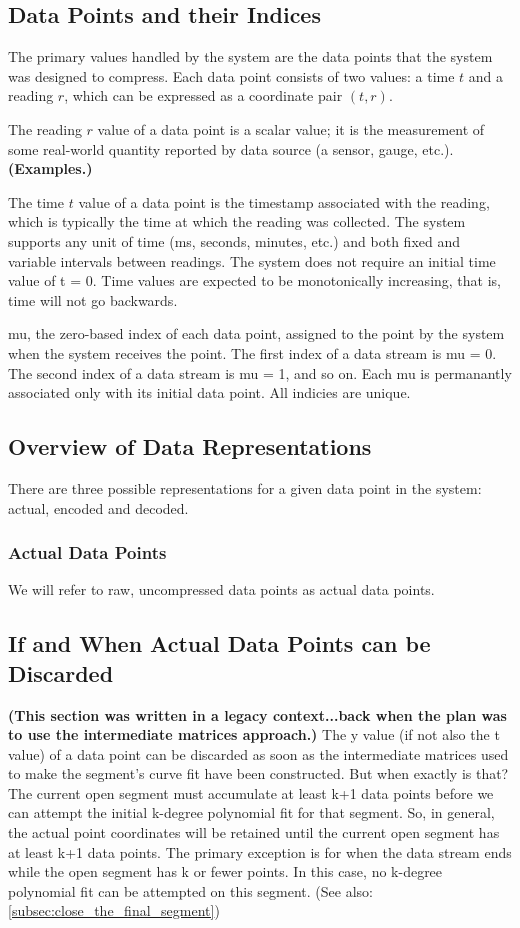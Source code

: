 \documentclass{article}
\begin{document}
\subsection{Data Points and their Indices}
The primary values handled by the system are the data points that the system was designed to compress. Each data point consists of two values: a time \(t\) and a reading \(r\), which can be expressed as a coordinate pair \((t, r)\).

The reading \(r\) value of a data point is a scalar value; it is the measurement of some real-world quantity reported by data source (a sensor, gauge, etc.). \textbf{(Examples.)}

The time \(t\) value of a data point is the timestamp associated with the reading, which is typically the time at which the reading was collected. The system supports any unit of time (ms, seconds, minutes, etc.) and both fixed and variable intervals between readings. The system does not require an initial time value of t = 0. Time values are expected to be monotonically increasing, that is, time will not go backwards.

mu, the zero-based index of each data point, assigned to the point by the system when the system receives the point. The first index of a data stream is mu = 0. The second index of a data stream is mu = 1, and so on. Each mu is permanantly associated only with its initial data point. All indicies are unique.

\subsection{Overview of Data Representations}
There are three possible representations for a given data point in the system: actual, encoded and decoded.
\subsubsection{Actual Data Points}
We will refer to raw, uncompressed data points as actual data points. 

\subsection{If and When Actual Data Points can be Discarded}
\label{subsec:when_can_discard_point_coords}
\textbf{(This section was written in a legacy context...back when the plan was to use the intermediate matrices approach.)}
The y value (if not also the t value) of a data point can be discarded as soon as the intermediate matrices used to make the segment’s curve fit have been constructed. But when exactly is that? The current open segment must accumulate at least k+1 data points before we can attempt the initial k-degree polynomial fit for that segment. So, in general, the actual point coordinates will be retained until the current open segment has at least k+1 data points. The primary exception is for when the data stream ends while the open segment has k or fewer points. In this case, no k-degree polynomial fit can be attempted on this segment. (See also: \ref{subsec:close_the_final_segment})
\end{document}
